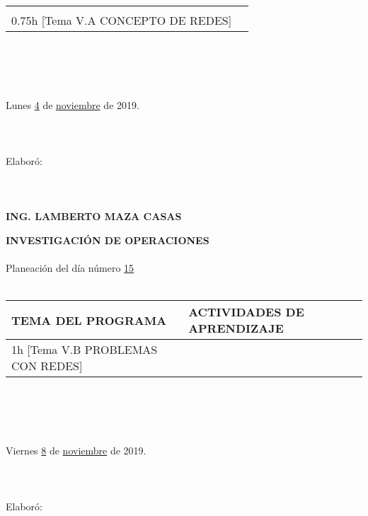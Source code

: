 \documentclass[landscape]{article}
\begin{document}
{\begin{center}
\begin{tabular}{|p{11cm}|p{8cm}|}
&\\
	0.75h	[Tema V.A CONCEPTO DE REDES]
&\\
\hline
\end{tabular}
\ \\
\ \\
\ \\
\ \\
Lunes \underline{\hspace{0.5cm}4\hspace{0.5cm}} de  \underline{\hspace{0.5cm}noviembre\hspace{0.5cm}} de 2019.
\ \\
\ \\
\ \\
\ \\
Elabor\'o:
\ \\
\ \\
\ \\
\ \\
{\bf ING. LAMBERTO MAZA CASAS}
\end{center}
\eject
\begin{center}
{\bf 
INVESTIGACI\'ON DE OPERACIONES
}
\ \\
\ \\
Planeaci\'on del d\'ia n\'umero \underline{\hspace{0.5cm}15\hspace{0.5cm}}
\ \\
\ \\
\begin{tabular}{|p{11cm}|p{8cm}|}\hline
{\bf TEMA DEL PROGRAMA}&{\bf ACTIVIDADES DE APRENDIZAJE}\\\hline
	1h	[Tema V.B PROBLEMAS CON REDES]
&\\
\hline
\end{tabular}
\ \\
\ \\
\ \\
\ \\
Viernes \underline{\hspace{0.5cm}8\hspace{0.5cm}} de  \underline{\hspace{0.5cm}noviembre\hspace{0.5cm}} de 2019.
\ \\
\ \\
\ \\
\ \\
Elabor\'o:
\ \\
\ \\
\ \\

\end{center}}
\end{document}
